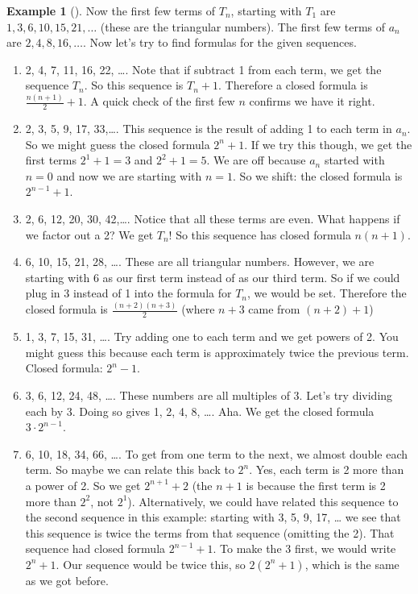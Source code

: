 \documentclass[10pt,]{book}
\theoremstyle{plain}
\theoremstyle{definition}
\newtheorem{example}[theorem]{Example}
\theoremstyle{definition}
\theoremstyle{definition}
\numberwithin{equation}{chapter}
\begin{document}
\begin{example}[]
        Now the first few terms of \(T_n\)\label{notation-8}
, starting with \(T_1\) are \(1, 3, 6, 10, 15, 21, \ldots\) (these are the triangular numbers). The first few terms of \(a_n\) are \(2, 4, 8, 16, \ldots\). Now let's try to find formulas for the given sequences.
      \leavevmode%
\begin{enumerate}
\item\hypertarget{li-844}{}
            2, 4, 7, 11, 16, 22, \dots{}. Note that if subtract 1 from each term, we get the sequence \(T_n\). So this sequence is \(T_n + 1\). Therefore a closed formula is \(\frac{n(n+1)}{2} + 1\). A quick check of the first few \(n\) confirms we have it right.
\item\hypertarget{li-845}{}
            2, 3, 5, 9, 17, 33,\dots{}. This sequence is the result of adding 1 to each term in \(a_n\). So we might guess the closed formula \(2^n + 1\). If we try this though, we get the first terms \(2^1 + 1 = 3\) and \(2^2 + 1 = 5\). We are off because \(a_n\) started with \(n = 0\) and now we are starting with \(n = 1\). So we shift: the closed formula is \(2^{n-1} + 1\).
\item\hypertarget{li-846}{}
            2, 6, 12, 20, 30, 42,\dots{}. Notice that all these terms are even. What happens if we factor out a 2? We get \(T_n\)! So this sequence has closed formula \(n(n+1)\).
\item\hypertarget{li-847}{}
            6, 10, 15, 21, 28, \dots{}. These are all triangular numbers. However, we are starting with 6 as our first term instead of as our third term. So if we could plug in 3 instead of 1 into the formula for \(T_n\), we would be set. Therefore the closed formula is \(\frac{(n+2)(n+3)}{2}\) (where \(n+3\) came from \((n+2)+1\))
\item\hypertarget{li-848}{}
            1, 3, 7, 15, 31, \dots{}. Try adding one to each term and we get powers of 2. You might guess this because each term is approximately twice the previous term. Closed formula: \(2^{n} - 1\).
\item\hypertarget{li-849}{}
            3, 6, 12, 24, 48, \dots{}. These numbers are all multiples of 3. Let's try dividing each by 3. Doing so gives 1, 2, 4, 8, \dots{}. Aha. We get the closed formula \(3\cdot 2^{n-1}\).
\item\hypertarget{li-850}{}
            6, 10, 18, 34, 66, \dots{}. To get from one term to the next, we almost double each term. So maybe we can relate this back to \(2^n\). Yes, each term is 2 more than a power of 2. So we get \(2^{n+1} + 2\) (the \(n+1\) is because the first term is 2 more than \(2^2\), not \(2^1\)). Alternatively, we could have related this sequence to the second sequence in this example: starting with 3, 5, 9, 17, \dots{} we see that this sequence is twice the terms from that sequence (omitting the 2). That sequence had closed formula \(2^{n-1} + 1\). To make the 3 first, we would write \(2^{n} + 1\). Our sequence would be twice this, so \(2(2^n + 1)\), which is the same as we got before.

\end{enumerate}
\end{example}
\end{document}
